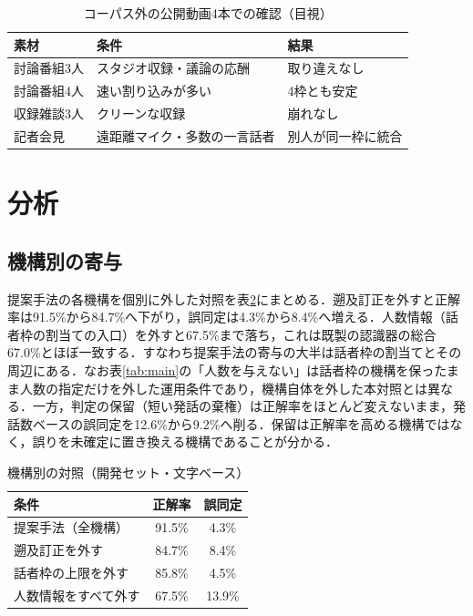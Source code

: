 \documentclass[a4paper]{ltjsarticle}
\begin{document}
\begin{table}[tb]
\centering
\caption{コーパス外の公開動画4本での確認（目視）}
\label{tab:wild}
\small
\begin{tabular}{lp{30mm}p{26mm}}
\toprule
素材 & 条件 & 結果 \\
\midrule
討論番組3人 & スタジオ収録・議論の応酬 & 取り違えなし \\
討論番組4人 & 速い割り込みが多い & 4枠とも安定 \\
収録雑談3人 & クリーンな収録 & 崩れなし \\
記者会見 & 遠距離マイク・多数の一言話者 & 別人が同一枠に統合 \\
\bottomrule
\end{tabular}
\end{table}

\section{分析}
\subsection{機構別の寄与}
提案手法の各機構を個別に外した対照を表\ref{tab:ablation}にまとめる．遡及訂正を外すと正解率は91.5\%から84.7\%へ下がり，誤同定は4.3\%から8.4\%へ増える．人数情報（話者枠の割当ての入口）を外すと67.5\%まで落ち，これは既製の認識器の総合67.0\%とほぼ一致する．すなわち提案手法の寄与の大半は話者枠の割当てとその周辺にある．なお表\ref{tab:main}の「人数を与えない」は話者枠の機構を保ったまま人数の指定だけを外した運用条件であり，機構自体を外した本対照とは異なる．一方，判定の保留（短い発話の棄権）は正解率をほとんど変えないまま，発話数ベースの誤同定を12.6\%から9.2\%へ削る．保留は正解率を高める機構ではなく，誤りを未確定に置き換える機構であることが分かる．

\begin{table}[tb]
\centering
\caption{機構別の対照（開発セット・文字ベース）}
\label{tab:ablation}
\small
\begin{tabular}{lcc}
\toprule
条件 & 正解率 & 誤同定 \\
\midrule
提案手法（全機構） & 91.5\% & 4.3\% \\
遡及訂正を外す & 84.7\% & 8.4\% \\
話者枠の上限を外す & 85.8\% & 4.5\% \\
人数情報をすべて外す & 67.5\% & 13.9\% \\
\bottomrule
\end{tabular}
\end{table}
\end{document}
